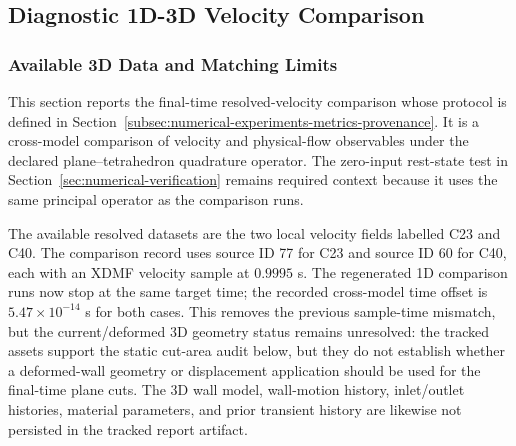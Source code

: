 \subsection{Diagnostic 1D-3D Velocity Comparison}
\label{sec:resolved-3d-comparison}

\subsubsection{Available 3D Data and Matching Limits}
\label{subsec:preliminary-cross-model-velocity-comparison}

This section reports the final-time resolved-velocity comparison whose protocol
is defined in Section~\ref{subsec:numerical-experiments-metrics-provenance}. It
is a cross-model comparison of velocity and physical-flow observables under the
declared plane--tetrahedron quadrature operator. The zero-input rest-state test
in Section~\ref{sec:numerical-verification} remains required context because it
uses the same principal operator as the comparison runs.

The available resolved datasets are the two local velocity fields labelled C23
and C40. The comparison record uses source ID 77 for C23 and source ID 60 for
C40, each with an XDMF velocity sample at $0.9995$ s. The regenerated 1D
comparison runs now stop at the same target time; the recorded cross-model time
offset is $5.47\times10^{-14}$ s for both cases. This removes the previous
sample-time mismatch, but the current/deformed 3D geometry status remains
unresolved: the tracked assets support the static cut-area audit below, but they
do not establish whether a deformed-wall geometry or displacement application
should be used for the final-time plane cuts. The 3D wall model, wall-motion
history, inlet/outlet histories, material parameters, and prior transient
history are likewise not persisted in the tracked report artifact.

